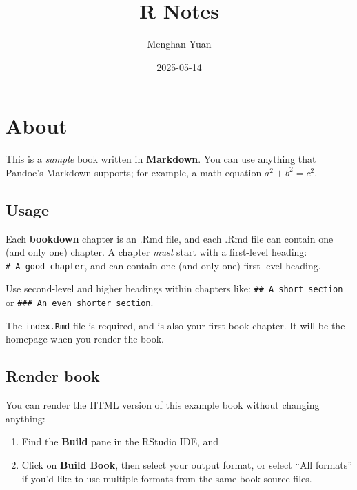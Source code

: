 \documentclass[
  a4paper,
  twoside,
  openright]{book}
\title{R Notes}
\author{Menghan Yuan}
\date{2025-05-14}
\providecommand{\tightlist}{%
  \setlength{\itemsep}{0pt}\setlength{\parskip}{0pt}}
\theoremstyle{definition}
\theoremstyle{definition}
\theoremstyle{definition}
\theoremstyle{definition}
\theoremstyle{remark}
\begin{document}
\maketitle

\let\tightlist\relax
\renewenvironment{Shaded}{\vspace{0.2\baselineskip}\begin{snugshade}}{\end{snugshade}}

% 
% 
% 

{
\setcounter{tocdepth}{1}
\tableofcontents
}
\chapter{About}\label{about}

This is a \emph{sample} book written in \textbf{Markdown}. You can use anything that Pandoc's Markdown supports; for example, a math equation \(a^2 + b^2 = c^2\).

\section{Usage}\label{usage}

Each \textbf{bookdown} chapter is an .Rmd file, and each .Rmd file can contain one (and only one) chapter. A chapter \emph{must} start with a first-level heading: \texttt{\#\ A\ good\ chapter}, and can contain one (and only one) first-level heading.

Use second-level and higher headings within chapters like: \texttt{\#\#\ A\ short\ section} or \texttt{\#\#\#\ An\ even\ shorter\ section}.

The \texttt{index.Rmd} file is required, and is also your first book chapter. It will be the homepage when you render the book.

\section{Render book}\label{render-book}

You can render the HTML version of this example book without changing anything:

\begin{enumerate}
\def\labelenumi{\arabic{enumi}.}
\item
  Find the \textbf{Build} pane in the RStudio IDE, and
\item
  Click on \textbf{Build Book}, then select your output format, or select ``All formats'' if you'd like to use multiple formats from the same book source files.
\end{enumerate}
\end{document}
